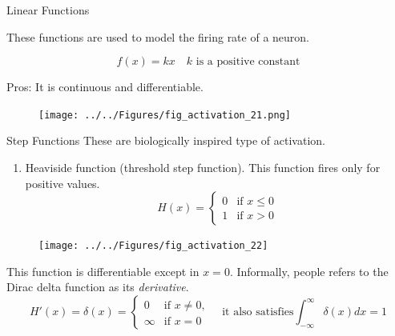 \documentclass{beamer}
\begin{document}
\begin{frame}{Linear Functions}
	
	These functions are used to model the firing rate of a neuron.
	
	\begin{equation*}
		f(x)= kx \quad k \text{ is a positive constant}
	\end{equation*}

Pros: It is continuous and differentiable.	

\begin{figure}[h]
	\centering
	\texttt{[image: ../../Figures/fig\_activation\_21.png]}
\end{figure}

	
\end{frame}

\begin{frame}{Step Functions}
	These are biologically inspired type of activation.
	
	\begin{enumerate}
		\item Heaviside function (threshold step function). This function fires only for positive values.
		\begin{equation*}
			H(x)=
			\begin{cases}
				0 & \text{if }x\le 0 \\
				1 & \text{if } x >0
			\end{cases}
		\end{equation*}
	
	\end{enumerate}
\begin{figure}[h]
	\centering
	\texttt{[image: ../../Figures/fig\_activation\_22]}
\end{figure}

This function is differentiable except in $x=0$.  Informally, people refers to the Dirac delta function as its \textit{derivative}. 
\begin{equation*}
	H'(x)= \delta(x) =\begin{cases}
		0 & \text{if } x \ne 0,\\
		\infty & \text{if } x=0
	\end{cases} \quad \text{it also satisfies} \int_{-\infty}^{\infty} \delta(x)dx =1
\end{equation*}


\end{frame}
\end{document}
